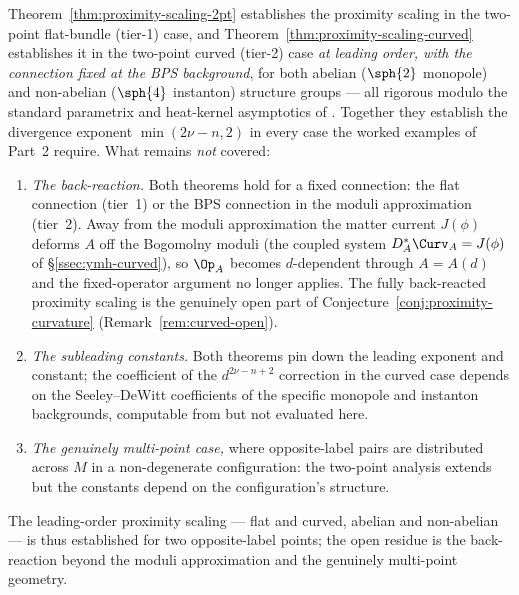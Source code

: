 \begin{remark}
\label{rem:proof-limitations}
Theorem~\ref{thm:proximity-scaling-2pt} establishes the proximity
scaling in the two-point flat-bundle (tier-1) case, and
Theorem~\ref{thm:proximity-scaling-curved} establishes it in the
two-point curved (tier-2) case \emph{at leading order, with the
connection fixed at the BPS background}, for both abelian ($\sph{2}$
monopole) and non-abelian ($\sph{4}$ instanton) structure groups ---
all rigorous modulo the standard parametrix and heat-kernel
asymptotics of \cite{Seeley1967,Stein1999,Gilkey1995}. Together they
establish the divergence exponent $\min(2\nu-n,2)$ in every case the
worked examples of Part~2 require. What remains \emph{not} covered:
\begin{enumerate}[label=(\roman*),leftmargin=2em]
\item \emph{The back-reaction.} Both theorems hold for a fixed
connection: the flat connection (tier~1) or the BPS connection in the
moduli approximation (tier~2). Away from the moduli approximation the
matter current $J(\phi)$ deforms $A$ off the Bogomolny moduli (the
coupled system $D_A^*\Curv_A=J(\phi)$ of \S\ref{ssec:ymh-curved}), so
$\Op_A$ becomes $d$-dependent through $A=A(d)$ and the fixed-operator
argument no longer applies. The fully back-reacted proximity scaling
is the genuinely open part of
Conjecture~\ref{conj:proximity-curvature}
(Remark~\ref{rem:curved-open}).
\item \emph{The subleading constants.} Both theorems pin down the
leading exponent and constant; the coefficient of the
$d^{2\nu-n+2}$ correction in the curved case depends on the
Seeley--DeWitt coefficients of the specific monopole and instanton
backgrounds, computable from \cite{Gilkey1995} but not evaluated here.
\item \emph{The genuinely multi-point case,} where opposite-label
pairs are distributed across $M$ in a non-degenerate configuration:
the two-point analysis extends but the constants depend on the
configuration's structure.
\end{enumerate}
The leading-order proximity scaling --- flat and curved, abelian and
non-abelian --- is thus established for two opposite-label points; the
open residue is the back-reaction beyond the moduli approximation and
the genuinely multi-point geometry.
\end{remark}

